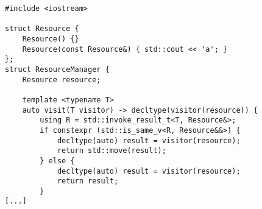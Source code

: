 \begin{lstlisting}[title=\href{https://godbolt.org/z/jpCb6h}{\texttt{godbolt.org/z/jpCb6h}}]
#include <iostream>

struct Resource {
    Resource() {}
    Resource(const Resource&) { std::cout << 'a'; }
};
struct ResourceManager {
    Resource resource;

    template <typename T>
    auto visit(T visitor) -> decltype(visitor(resource)) {
        using R = std::invoke_result_t<T, Resource&>;
        if constexpr (std::is_same_v<R, Resource&&>) {
            decltype(auto) result = visitor(resource);
            return std::move(result);
        } else {
            decltype(auto) result = visitor(resource);
            return result;
        }
[...]
\end{lstlisting}
